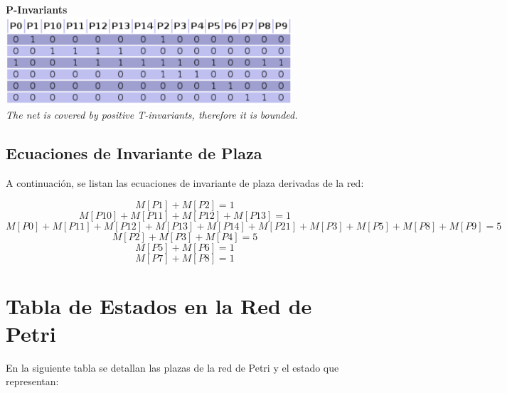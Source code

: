 \documentclass[12pt]{article}
\begin{document}
\begin{center}
    \textbf{P-Invariants}\\
    \includegraphics[width=0.8\textwidth]{P-invariants.png}\\
    \textit{The net is covered by positive T-invariants, therefore it is bounded.}
\end{center}

\newpage

\subsection{Ecuaciones de Invariante de Plaza}
A continuación, se listan las ecuaciones de invariante de plaza derivadas de la red:

\[
M[P1] + M[P2] = 1
\]
\[
M[P10] + M[P11] + M[P12] + M[P13] = 1
\]
\[
M[P0] + M[P11] + M[P12] + M[P13] + M[P14] + M[P21] + M[P3] + M[P5] + M[P8] + M[P9] = 5
\]
\[
M[P2] + M[P3] + M[P4] = 5
\]
\[
M[P5] + M[P6] = 1
\]
\[
M[P7] + M[P8] = 1
\]

\section{Tabla de Estados en la Red de Petri}
En la siguiente tabla se detallan las plazas de la red de Petri y el estado que representan:
\end{document}
